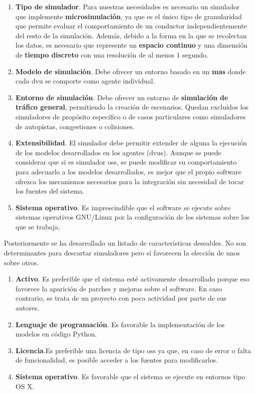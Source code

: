\begin{enumerate}
	\item \textbf{Tipo de simulador}. Para nuestras necesidades es necesario un simulador que implemente \textbf{microsimulación}, ya que es el único tipo de granularidad que permite evaluar el comportamiento de un conductor independientemente del resto de la simulación. Además, debido a la forma en la que se recolectan los datos, es necesario que represente un \textbf{espacio continuo} y una dimensión de \textbf{tiempo discreto} con una resolución de al menos $1$ segundo.
	\item \textbf{Modelo de simulación}. Debe ofrecer un entorno basado en un \textbf{\gls{mas}} donde cada \gls{dvu} se comporte como agente individual.
	\item \textbf{Entorno de simulación}. Debe ofrecer un entorno de \textbf{simulación de tráfico general}, permitiendo la creación de escenarios. Quedan excluídos los simuladores de propósito específico o de casos particulares como simuladores de autopistas, congestiones o colisiones.
	\item \textbf{Extensibilidad}. El simulador debe permitir extender de alguna la ejecución de los modelos desarrollados en los agentes (\glspl{dvu}). Aunque se puede considerar que si es simulador \gls{oss}, se puede modificar su comportamiento para adecuarlo a los modelos desarrollados, es mejor que el propio software ofrezca los mecanismos necesarios para la integración sin necesidad de tocar los fuentes del sistema.
	\item \textbf{Sistema operativo}. Es imprescindible que el software se ejecute sobre sistemas operativos GNU/Linux por la configuración de los sistemas sobre los que se trabaja.
\end{enumerate}

Posteriormente se ha desarrollado un listado de características deseables. No son determinantes para descartar simuladores pero sí favorecen la elección de unos sobre otros.

\begin{enumerate}
	\item \textbf{Activo}. Es preferible que el sistema esté activamente desarrollado porque eso favorece la aparición de parches y mejoras sobre el software. En caso contrario, se trata de un proyecto con poca actividad por parte de sus autores.
	\item \textbf{Lenguaje de programación}. Es favorable la implementación de los modelos en código Python.
	\item \textbf{Licencia}.Es preferible una licencia de tipo \Ac{oss} ya que, en caso de error o falta de funcionalidad, es posible acceder a los fuentes para modificarlos.
	\item \textbf{Sistema operativo}. Es favorable que el sistema se ejecute en entornos tipo OS X.
\end{enumerate}

